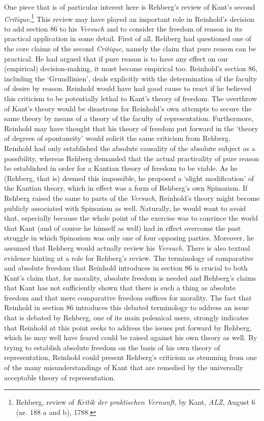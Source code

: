  One piece that is of particular interest here is Rehberg's review of Kant's second \textit{Critique}.\footnote{ Rehberg, review of \textit{Kritik der praktischen Vernunft}, by Kant, \textit{ALZ}, August 6 (nr. 188 a and b), 1788. } This review may have played an important role in Reinhold's decision to add section 86 to his \textit{Versuch} and to consider the freedom of reason in its practical application in some detail. First of all, Rehberg had questioned one of the core claims of the second \textit{Critique}, namely the claim that pure reason can be practical. He had argued that if pure reason is to have any effect on our (empirical) decision{-}making, it must become empirical too. Reinhold's section 86, including the `Grundlinien', deals explicitly with the determination of the faculty of desire by reason. Reinhold would have had good cause to react if he believed this criticism to be potentially lethal to Kant's theory of freedom. The overthrow of Kant's theory would be disastrous for Reinhold's own attempts to secure the same theory by means of a theory of the faculty of representation. Furthermore, Reinhold may have thought that his theory of freedom put forward in the `theory of degrees of spontaneity' would solicit the same criticism from Rehberg. Reinhold had only established the absolute causality of the absolute subject as a possibility, whereas Rehberg demanded that the actual practicality of pure reason be established in order for a Kantian theory of freedom to be viable. As he (Rehberg, that is) deemed this impossible, he proposed a `slight modification' of the Kantian theory, which in effect was a form of Rehberg's own Spinozism. If Rehberg raised the same to parts of the \textit{Versuch}, Reinhold's theory might become publicly associated with Spinozism as well. Naturally, he would want to avoid that, especially because the whole point of the exercise was to convince the world that Kant (and of course he himself as well) had in effect overcome the past struggle in which Spinozism was only one of four opposing parties. Moreover, he assumed that Rehberg would actually review his \textit{Versuch}. There is also textual evidence hinting at a role for Rehberg's review. The terminology of comparative and absolute freedom that Reinhold introduces in section 86 is crucial to both Kant's claim that, for morality, absolute freedom is needed and Rehberg's claims that Kant has not sufficiently shown that there is such a thing as absolute freedom and that mere comparative freedom suffices for morality. The fact that Reinhold in section 86 introduces this debated terminology to address an issue that is debated by Rehberg, one of its main polemical users, strongly indicates that Reinhold at this point seeks to address the issues put forward by Rehberg, which he may well have feared could be raised against his own theory as well. By trying to establish absolute freedom on the basis of his own theory of representation, Reinhold could present Rehberg's criticism as stemming from one of the many misunderstandings of Kant that are remedied by the universally acceptable theory of representation. 

